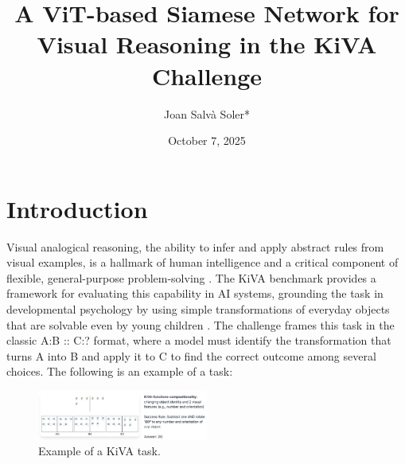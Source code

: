 \documentclass[twocolumn]{article} %
\date{October 7, 2025}
\title{A ViT-based Siamese Network for Visual Reasoning in the KiVA Challenge }
\author[1]{Joan Salvà Soler*\orcidA{}}
\affil[1]{H2O.ai}
\begin{document}



\section{Introduction}

Visual analogical reasoning, the ability to infer and apply abstract rules from visual examples, is a hallmark of human intelligence and a critical component of flexible, general-purpose problem-solving \cite{gentner1983}. The KiVA benchmark provides a framework for evaluating this capability in AI systems, grounding the task in developmental psychology by using simple transformations of everyday objects that are solvable even by young children \cite{yee2025kiva}. The challenge frames this task in the classic A:B :: C:? format, where a model must identify the transformation that turns A into B and apply it to C to find the correct outcome among several choices. The following is an example of a task:

\begin{figure}[h]\vspace{-0.5\baselineskip}
    \centering
    \includegraphics[width=0.5\textwidth]{figures/kiva-example.png}
    \caption{Example of a KiVA task.}
    \label{fig:kiva_example}
\end{figure}\vspace{-0.5\baselineskip}
\end{document}
